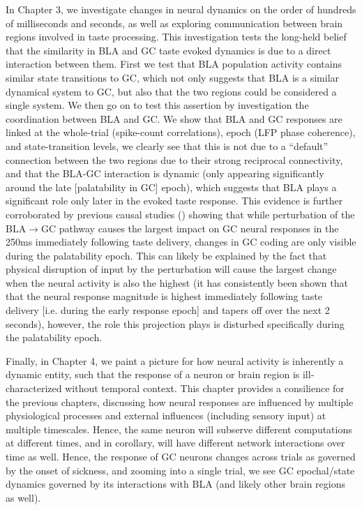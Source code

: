 \begin{refsection}
In Chapter 3, we investigate changes in neural dynamics on the order of hundreds of milliseconds and seconds, as well as exploring communication between brain regions involved in taste processing. This investigation tests the long-held belief that the similarity in BLA and GC taste evoked dynamics is due to a direct interaction between them. First we test that BLA population activity contains similar state transitions to GC, which not only suggests that BLA is a similar dynamical system to GC, but also that the two regions could be considered a single system. We then go on to test this assertion by investigation the coordination between BLA and GC. We show that BLA and GC responses are linked at the whole-trial (spike-count correlations), epoch (LFP phase coherence), and state-transition levels, we clearly see that this is not due to a “default” connection between the two regions due to their strong reciprocal connectivity, and that the BLA-GC interaction is dynamic (only appearing significantly around the late [palatability in GC] epoch), which suggests that BLA plays a significant role only later in the evoked taste response. This evidence is further corroborated by previous causal studies (\cite{lin2021a}) showing that while perturbation of the BLA$\rightarrow$GC pathway causes the largest impact on GC neural responses in the 250ms immediately following taste delivery, changes in GC coding are only visible during the palatability epoch. This can likely be explained by the fact that physical disruption of input by the perturbation will cause the largest change when the neural activity is also the highest (it has consistently been shown that that the neural response magnitude is highest immediately following taste delivery [i.e. during the early response epoch] and tapers off over the next 2 seconds), however, the role this projection plays is disturbed specifically during the palatability epoch.

Finally, in Chapter 4, we paint a picture for how neural activity is inherently a dynamic entity, such that the response of a neuron or brain region is ill-characterized without temporal context. This chapter provides a consilience for the previous chapters, discussing how neural responses are influenced by multiple physiological processes and external influences (including sensory input) at multiple timescales. Hence, the same neuron will subserve different computations at different times, and in corollary, will have different network interactions over time as well. Hence, the response of GC neurons changes across trials as governed by the onset of sickness, and zooming into a single trial, we see GC epochal/state dynamics governed by its interactions with BLA (and likely other brain regions as well).


\end{refsection}
